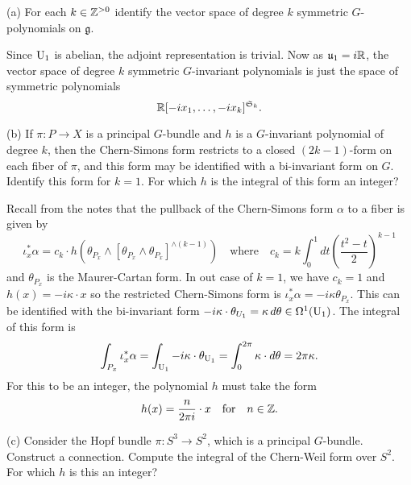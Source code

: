 \documentclass{../../templates/lkx_pset}
\begin{document}
\begin{parts}
	\begin{part}{(a)}
		For each $k\in \mathbb{Z}^{>0}$ identify the vector space of degree $k$ symmetric $G$-polynomials on $\mathfrak{g}$.
	\end{part}

	Since $\operatorname{U}_1$ is abelian, the adjoint representation is trivial.
	Now as $\mathfrak{u}_1=i\mathbb{R}$, the vector space of degree $k$ symmetric $G$-invariant polynomials is just the space of symmetric polynomials
	\[
		\mathbb{R}[-ix_1, \ldots, -ix_k]^{\mathfrak{S}_k}.
	\]

	\begin{part}{(b)}
		If $\pi : P \to X$ is a principal $G$-bundle and $h$ is a $G$-invariant polynomial of degree $k$, then the Chern-Simons form restricts to a closed $(2k-1)$-form on each fiber of $\pi$, and this form may be identified with a bi-invariant form on $G$. Identify this form for $k=1$. For which $h$ is the integral of this form an integer?
	\end{part}

	Recall from the notes that the pullback of the Chern-Simons form $\alpha$ to a fiber is given by
	\[
		\iota_x^*\alpha = c_k\cdot h(\theta_{P_x}\wedge [\theta_{P_x}\wedge \theta_{P_x}]^{\wedge(k-1)})\quad\textrm{where}\quad c_k = k\int_0^1 dt\left(\frac{t^2-t}{2}\right)^{k-1}
	\]
	and $\theta_{P_x}$ is the Maurer-Cartan form. In out case of $k=1$, we have $c_k=1$ and $h(x)=-i\kappa\cdot x$ so the restricted Chern-Simons form is $\iota_x^*\alpha = -i\kappa\theta_{P_x}.$ This can be identified with the bi-invariant form $-i\kappa\cdot \theta_{U_1} = \kappa\,d\theta\in \Omega^1(\operatorname{U}_1)$. The integral of this form is
	\[
		\int_{P_x} \iota_x^*\alpha= \int_{\operatorname{U}_1} -i\kappa\cdot \theta_{\operatorname{U}_1} = \int_0^{2\pi} \kappa \cdot d\theta = 2\pi \kappa.
	\]
	For this to be an integer, the polynomial $h$ must take the form
	\[
		h(x) = \frac{n}{2\pi i}\cdot x\quad\textrm{for}\quad n\in \mathbb{Z}.
	\]

	\begin{part}{(c)}
		Consider the Hopf bundle $\pi : S^3 \to S^2$, which is a principal $G$-bundle. Construct a connection. Compute the integral of the Chern-Weil form over $S^2$. For which $h$ is this an integer?
	\end{part}


\end{parts}
\end{document}
